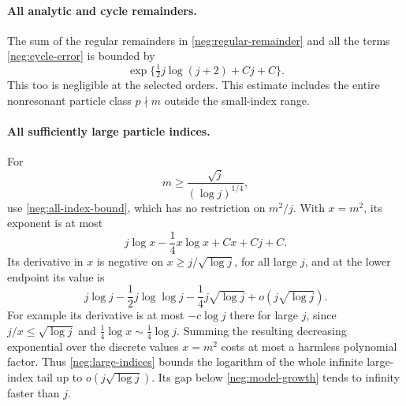 \documentclass[11pt]{article}
\numberwithin{equation}{section}
\theoremstyle{definition}
\begin{document}
\paragraph{All analytic and cycle remainders.}
The sum of the regular remainders in
\eqref{neg:regular-remainder} and all the terms
\eqref{neg:cycle-error} is bounded by
\begin{equation}
 \exp\{\tfrac12j\log(j+2)+Cj+C\}.
 \label{neg:all-remainders}
\end{equation}
This too is negligible at the selected orders.  This estimate
includes the entire nonresonant particle class \(p\nmid m\)
outside the small-index range.

\paragraph{All sufficiently large particle indices.}
For
\[
 m\ge\frac{\sqrt j}{(\log j)^{1/4}},
 \]
use \eqref{neg:all-index-bound}, which has no restriction
on \(m^2/j\).  With \(x=m^2\), its exponent is at most
\[
 j\log x-\frac14x\log x+Cx+Cj+C .
 \]
Its derivative in \(x\) is negative on
\(x\ge j/\sqrt{\log j}\), for all large \(j\), and at the
lower endpoint its value is
\begin{equation}
 j\log j-\frac12j\log\log j
            -\frac14j\sqrt{\log j}
            +o(j\sqrt{\log j}).
 \label{neg:large-indices}
\end{equation}
For example its derivative is at most \(-c\log j\)
there for large \(j\), since
\(j/x\le\sqrt{\log j}\) and
\(\tfrac14\log x\sim\tfrac14\log j\).
Summing the resulting decreasing exponential over the
discrete values \(x=m^2\) costs at most a harmless polynomial
factor.  Thus \eqref{neg:large-indices} bounds the logarithm
of the whole infinite large-index tail up to
\(o(j\sqrt{\log j})\).
Its gap below \eqref{neg:model-growth} tends to infinity
faster than \(j\).
\end{document}
